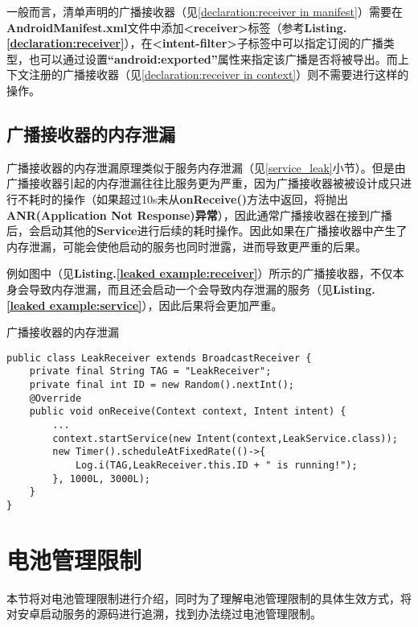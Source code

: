一般而言，清单声明的广播接收器（见\ref{declaration:receiver in manifest}）需要在\textbf{AndroidManifest.xml}文件中添加\textbf{<receiver>}标签（参考\textbf{Listing.\textcolor{red}{\ref{declaration:receiver}}}），在\textbf{<intent-filter>}子标签中可以指定订阅的广播类型，也可以通过设置\textbf{“android:exported”}属性来指定该广播是否将被导出。而上下文注册的广播接收器（见\ref{declaration:receiver in context}）则不需要进行这样的操作。
\subsection{广播接收器的内存泄漏}
广播接收器的内存泄漏原理类似于服务内存泄漏（见\ref{service_leak}小节）。但是由广播接收器引起的内存泄漏往往比服务更为严重，因为广播接收器被被设计成只进行不耗时的操作（如果超过10s未从\textbf{onReceive()}方法中返回，将抛出\textbf{ANR(Application Not Response)异常}），因此通常广播接收器在接到广播后，会启动其他的\textbf{Service}进行后续的耗时操作。因此如果在广播接收器中产生了内存泄漏，可能会使他启动的服务也同时泄露，进而导致更严重的后果。

例如图中（见\textbf{Listing.\textcolor{red}{\ref{leaked example:receiver}}}）所示的广播接收器，不仅本身会导致内存泄漏，而且还会启动一个会导致内存泄漏的服务（见\textbf{Listing.\textcolor{red}{\ref{leaked example:service}}}），因此后果将会更加严重。
\begin{listing}[htbp]
	\centering
	\caption{广播接收器的内存泄漏}
	\begin{verbatim}
public class LeakReceiver extends BroadcastReceiver {
	private final String TAG = "LeakReceiver";
	private final int ID = new Random().nextInt();
	@Override
	public void onReceive(Context context, Intent intent) {
		...
		context.startService(new Intent(context,LeakService.class));
		new Timer().scheduleAtFixedRate(()->{
			Log.i(TAG,LeakReceiver.this.ID + " is running!");
		}, 1000L, 3000L);
	}
}
	\end{verbatim}
	\label{leaked example:receiver}
\end{listing}

\section{电池管理限制}

本节将对电池管理限制进行介绍，同时为了理解电池管理限制的具体生效方式，将对安卓启动服务的源码进行追溯，找到办法绕过电池管理限制。

